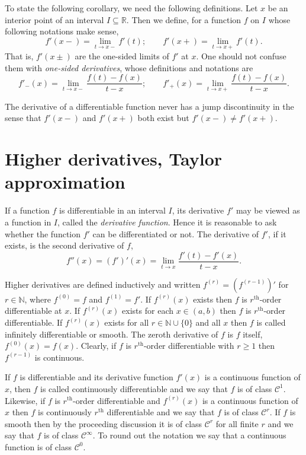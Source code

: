 To state the following corollary, we need the following definitions.
Let $x$ be an interior point of an interval $I \subseteq \mathbb{R}$.
Then we define, for a function $f$ on $I$ whose following notations make sense,
\[
  f'(x-) = \lim_{t \to x-} f'(t); \qquad
  f'(x+) = \lim_{t \to x+} f'(t).
\]
That is, $f'(x\pm)$ are the one-sided limits of $f'$ at $x$.
One should not confuse them with \textit{one-sided derivatives}, whose definitions and notations are
\[
  f'_-(x) = \lim_{t \to x-} \frac{ f(t) - f(x) }{ t - x }; \qquad
  f'_+(x) = \lim_{t \to x+} \frac{ f(t) - f(x) }{ t - x }.
\]
\begin{cor}
  The derivative of a differentiable function never has a jump discontinuity in the sense that $f'(x-)$ and $f'(x+)$ both exist but $f'(x-) \ne f'(x+)$.
\end{cor}

\section{Higher derivatives, Taylor approximation}
\label{sec:higher-diff}

If a function $f$ is differentiable in an interval $I$, its derivative $f'$ may be viewed as a function in $I$, called the \textit{derivative function}.
Hence it is reasonable to ask whether the function $f'$ can be differentiated or not.
The derivative of $f'$, if it exists, is the \textsf{second derivative} of $f$,
\[
  f''(x) = (f')'(x) = \lim_{t \to x} \frac{ f'(t) - f'(x) }{ t - x }.
\]

Higher derivatives are defined inductively and written $f^{(r)} = ( f^{(r-1)} )'$ for $r \in \mathbb{N}$, where $f^{(0)} = f$ and $f^{(1)} = f'$.
If $f^{(r)}(x)$ exists then $f$ is \textsf{$r^\text{th}$-order differentiable} at $x$.
If $f^{(r)}(x)$ exists for each $x \in (a,b)$ then $f$ is \textsf{$r^\text{th}$-order differentiable}.
If $f^{(r)}(x)$ exists for all $r \in \mathbb{N} \cup \{0\}$ and all $x$ then $f$ is called \textsf{infinitely differentiable} or \textsf{smooth}.
The \textsf{zeroth derivative} of $f$ is $f$ itself, $f^{(0)}(x) = f(x)$.
Clearly, if $f$ is $r^{\text{th}}$-order differentiable with $r \geqslant 1$ then $f^{(r-1)}$ is continuous.

If $f$ is differentiable and its derivative function $f'(x)$ is a continuous function of $x$, then $f$ is called \textsf{continuously differentiable} and we say that $f$ is \textsf{of class $\mathcal{C}^1$}.
Likewise, if $f$ is $r^{\text{th}}$-order differentiable and $f^{(r)}(x)$ is a continuous function of $x$ then $f$ is \textsf{continuously $r^{\text{th}}$ differentiable} and we say that $f$ is \textsf{of class $\mathcal{C}^r$}.
If $f$ is smooth then by the proceeding discussion it is of class $\mathcal{C}^r$ for all finite $r$ and we say that $f$ is \textsf{of class $\mathcal{C}^\infty$}.
To round out the notation we say that a continuous function is of class $\mathcal{C}^0$.

